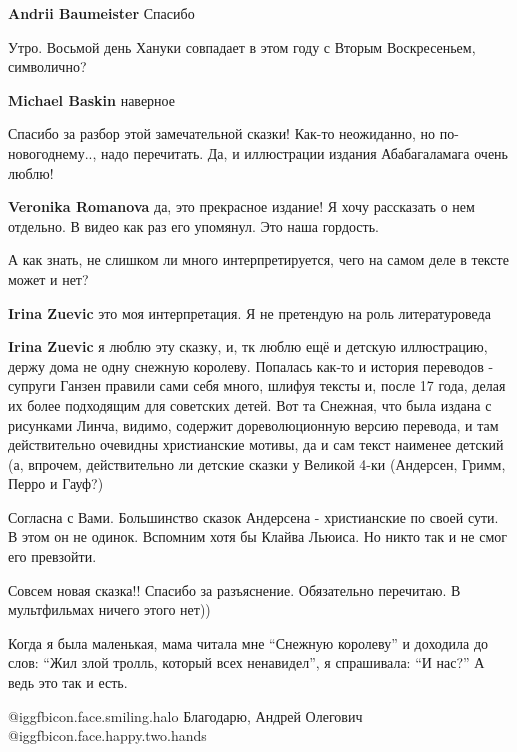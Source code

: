 \begin{itemize}
\begin{itemize}
\textbf{Andrii Baumeister} Спасибо
\end{itemize} %

Утро. Восьмой день Хануки совпадает в этом году с Вторым Воскресеньем, символично?


\textbf{Michael Baskin} наверное

Спасибо за разбор этой замечательной сказки! Как-то неожиданно, но по-новогоднему.., надо перечитать.
Да, и иллюстрации издания Абабагаламага очень люблю!


\textbf{Veronika Romanova} да, это прекрасное издание! Я хочу рассказать о нем отдельно. В видео как раз его упомянул. Это наша гордость.

А как знать, не слишком ли много интерпретируется, чего на самом деле в тексте может и нет?

\begin{itemize} %
\textbf{Irina Zuevic} это моя интерпретация. Я не претендую на роль литературоведа

\textbf{Irina Zuevic} я люблю эту сказку, и, тк люблю ещё и детскую иллюстрацию, держу дома не одну снежную королеву. Попалась как-то и история переводов - супруги Ганзен правили сами себя много, шлифуя тексты и, после 17 года, делая их более подходящим для советских детей. Вот та Снежная, что была издана с рисунками Линча, видимо, содержит дореволюционную версию перевода, и там действительно очевидны христианские мотивы, да и сам текст наименее детский (а, впрочем, действительно ли детские сказки у Великой 4-ки (Андерсен, Гримм, Перро и Гауф?)

Согласна с Вами. Большинство сказок Андерсена - христианские по своей сути. В этом он не одинок. Вспомним хотя бы Клайва Льюиса. Но никто так и не смог его превзойти.
\end{itemize} %

Совсем новая сказка!! Спасибо за разъяснение. Обязательно перечитаю. В мультфильмах ничего этого нет))


Когда я была маленькая, мама читала мне \enquote{Снежную королеву} и доходила до слов:
\enquote{Жил злой тролль, который всех ненавидел}, я спрашивала: \enquote{И нас?} А ведь это
так и есть.


 @igg{fbicon.face.smiling.halo}  Благодарю, Андрей Олегович @igg{fbicon.face.happy.two.hands} 


\end{itemize}
